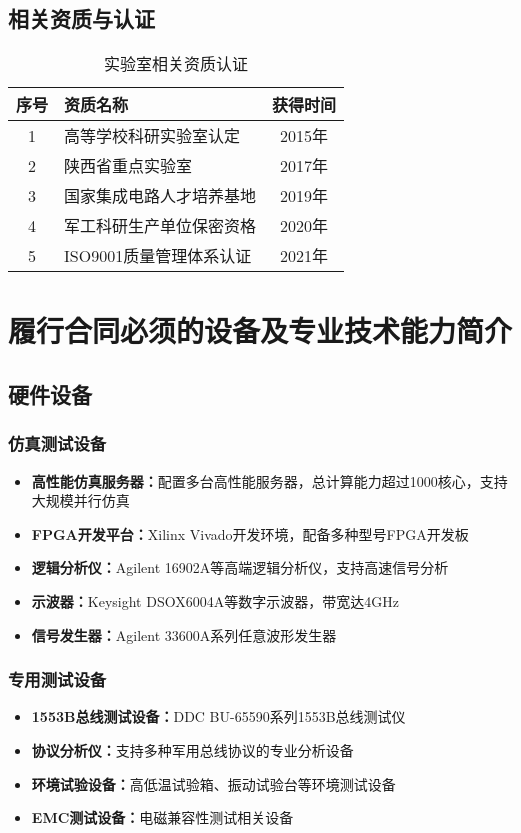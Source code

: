 \documentclass[fontset=windows]{article}
\begin{document}
\subsection{相关资质与认证}

\begin{table}[htbp]
    \centering
    \begin{tabular}{|c|l|c|}
        \hline
        序号 & 资质名称 & 获得时间 \\
        \hline
        1 & 高等学校科研实验室认定 & 2015年 \\
        2 & 陕西省重点实验室 & 2017年 \\
        3 & 国家集成电路人才培养基地 & 2019年 \\
        4 & 军工科研生产单位保密资格 & 2020年 \\
        5 & ISO9001质量管理体系认证 & 2021年 \\
        \hline
    \end{tabular}
    \caption{实验室相关资质认证}
    \label{tab:qualifications}
\end{table}

\section{履行合同必须的设备及专业技术能力简介}

\subsection{硬件设备}

\subsubsection{仿真测试设备}
\begin{itemize}
    \item \textbf{高性能仿真服务器：}配置多台高性能服务器，总计算能力超过1000核心，支持大规模并行仿真
    \item \textbf{FPGA开发平台：}Xilinx Vivado开发环境，配备多种型号FPGA开发板
    \item \textbf{逻辑分析仪：}Agilent 16902A等高端逻辑分析仪，支持高速信号分析
    \item \textbf{示波器：}Keysight DSOX6004A等数字示波器，带宽达4GHz
    \item \textbf{信号发生器：}Agilent 33600A系列任意波形发生器
\end{itemize}

\subsubsection{专用测试设备}
\begin{itemize}
    \item \textbf{1553B总线测试设备：}DDC BU-65590系列1553B总线测试仪
    \item \textbf{协议分析仪：}支持多种军用总线协议的专业分析设备
    \item \textbf{环境试验设备：}高低温试验箱、振动试验台等环境测试设备
    \item \textbf{EMC测试设备：}电磁兼容性测试相关设备
\end{itemize}
\end{document}

